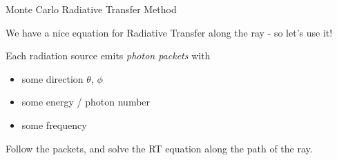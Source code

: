 \begin{frame}{Monte Carlo Radiative Transfer Method}

We have a nice equation for Radiative Transfer along the ray - so let's use it!

Each radiation source emits \emph{photon packets} with

\begin{itemize}
	\item some direction $\theta$, $\phi$
	\item some energy / photon number
	\item some frequency
\end{itemize}

Follow the packets, and solve the RT equation along the path of the ray.


\end{frame}






